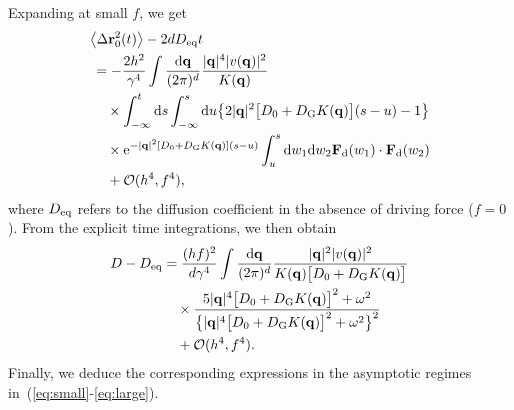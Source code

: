 \documentclass[pre, superscriptaddress, twocolumn,pre]{revtex4-1}
\begin{document}
Expanding at small $f$, we get
\begin{equation}
	\begin{aligned}
		&\big\langle\Delta{\bf r}^2_0(t)\big\rangle - 2 d D_{\rm eq} t
		\\
		&\,= - \frac{2h^2}{\gamma^4} \int \frac{{\rm d}{\bf q}}{(2\pi)^d} \frac{|{\bf q}|^4 |v({\bf q})|^2}{K({\bf q})}
		\\
		&\,\quad\times \int_{-\infty}^t{\rm d}s \int_{-\infty}^s{\rm d}u \big\{ 2|{\bf q}|^2\big[D_0+D_{\rm G}K({\bf q})\big](s-u) - 1\big\}
		\\
		&\,\quad\times {\rm e}^{ -|{\bf q}|^2[D_0+D_{\rm G}K({\bf q})](s-u)} \int_u^s {\rm d}w_1{\rm d}w_2 {\bf F}_{\rm d}(w_1)\cdot{\bf F}_{\rm d}(w_2)
		\\
		&\,\quad + {\cal O}(h^4,f^4) ,
	\end{aligned}
\end{equation}
where $D_{\rm eq}$ refers to the diffusion coefficient in the absence of driving force ($f=0$). From the explicit time integrations, we then obtain
\begin{equation}
	\begin{aligned}
		D - D_{\rm eq} &= \frac{(hf)^2}{d\gamma^4} \int \frac{{\rm d}{\bf q}}{(2\pi)^d} \frac{|{\bf q}|^2|v({\bf q})|^2}{K({\bf q})\big[D_0+D_{\rm G}K({\bf q})\big]}
		\\
		&\quad\times \frac{5|{\bf q}|^4\big[D_0+D_{\rm G}K({\bf q})\big]^2 + \omega^2}{ \big\{ |{\bf q}|^4\big[D_0+D_{\rm G}K({\bf q})\big]^2 + \omega^2 \big\}^2}
		\\
		&\quad + {\cal O}(h^4,f^4) .
	\end{aligned}
\end{equation}
Finally, we deduce the corresponding expressions in the asymptotic regimes in~(\ref{eq:small}-\ref{eq:large}).
\end{document}
